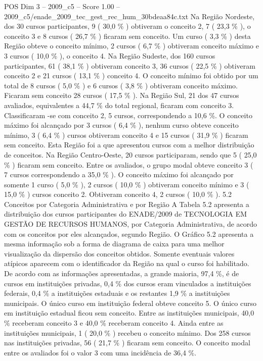 \begin{textsample}{POS Dim 3 – 2009\_c5 – Score 1.00 – 2009\_c5/enade\_2009\_tec\_gest\_rec\_hum\_30bdeaa84c.txt}
Na Região Nordeste, dos 30 cursos participantes, 9 ( 30,0 \% ) obtiveram o conceito 2, 7 ( 23,3 \% ), o conceito 3 e 8 cursos ( 26,7 \% ) ficaram sem conceito.
Um curso ( 3,3 \% ) desta Região obteve o conceito mínimo, 2 cursos ( 6,7 \% ) obtiveram conceito máximo e 3 cursos ( 10,0 \% ), o conceito 4.
Na Região Sudeste, dos 160 cursos participantes, 61 ( 38,1 \% ) obtiveram conceito 3, 36 cursos ( 22,5 \% ) obtiveram conceito 2 e 21 cursos ( 13,1 \% ) conceito 4.
O conceito mínimo foi obtido por um total de 8 cursos ( 5,0 \% ) e 6 cursos ( 3,8 \% ) obtiveram conceito máximo.
Ficaram sem conceito 28 cursos ( 17,5 \% ).
Na Região Sul, 21 dos 47 cursos avaliados, equivalentes a 44,7 \% do total regional, ficaram com conceito 3.
Classificaram -se com conceito 2, 5 cursos, correspondendo a 10,6 \%.
O conceito máximo foi alcançado por 3 cursos ( 6,4 \% ), nenhum curso obteve conceito mínimo, 3 ( 6,4 \% ) cursos obtiveram conceito 4 e 15 cursos ( 31,9 \% ) ficaram sem conceito.
Esta Região foi a que apresentou cursos com a melhor distribuição de conceitos.
Na Região Centro-Oeste, 20 cursos participaram, sendo que 5 ( 25,0 \% ) ficaram sem conceito.
Entre os avaliados, o grupo modal obteve conceito 3 ( 7 cursos correspondendo a 35,0 \% ).
O conceito máximo foi alcançado por somente 1 curso ( 5,0 \% ), 2 cursos ( 10,0 \% ) obtiveram conceito mínimo e 3 ( 15,0 \% ) cursos conceito 2.
Obtiveram conceito 4, 2 cursos ( 10,0 \% ). 5.2 Conceitos por Categoria Administrativa e por Região A Tabela 5.2 apresenta a distribuição dos cursos participantes do ENADE/2009 de TECNOLOGIA EM GESTÃO DE RECURSOS HUMANOS, por Categoria Administrativa, de acordo com os conceitos por eles alcançados, segundo Região.
O Gráfico 5.2 apresenta a mesma informação sob a forma de diagrama de caixa para uma melhor visualização da dispersão dos conceitos obtidos.
Somente eventuais valores atípicos aparecem com o identificador da Região na qual o curso foi habilitado.
De acordo com as informações apresentadas, a grande maioria, 97,4 \%, é de cursos em instituições privadas, 0,4 \% dos cursos eram vinculados a instituições federais, 0,4 \% a instituições estaduais e os restantes 1,9 \% a instituições municipais.
O único curso em instituição federal obteve conceito 5.
O único curso em instituição estadual ficou sem conceito.
Entre as instituições municipais, 40,0 \% receberam conceito 3 e 40,0 \% receberam conceito 4.
Ainda entre as instituições municipais, 1 ( 20,0 \% ) recebeu o conceito mínimo.
Dos 258 cursos nas instituições privadas, 56 ( 21,7 \% ) ficaram sem conceito.
O conceito modal entre os avaliados foi o valor 3 com uma incidência de 36,4 \%.

\end{textsample}
